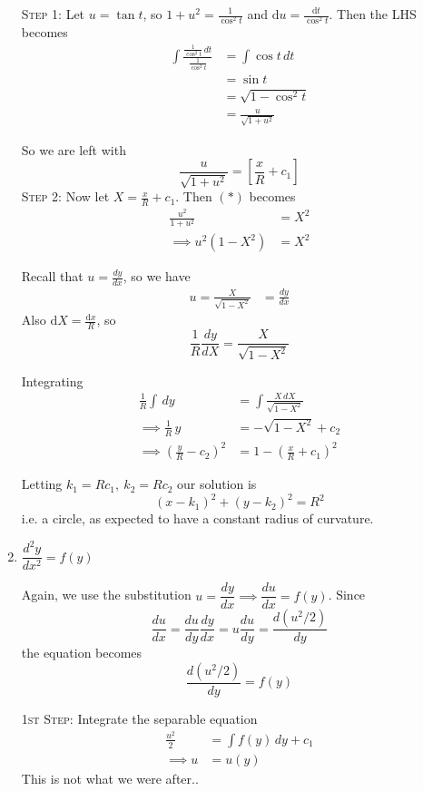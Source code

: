 \documentclass[10pt]{scrartcl}
\begin{document}
\begin{enumerate}[(1)]
\begin{example}[Geometry]
\textsc{Step 1:} Let $u = \tan t$, so $1 + u^2 = \frac{1}{\cos^2t}$ and $\mathrm{d}u = \frac{\mathrm{d}t}{\cos^2t}$. Then the LHS becomes
\[
\begin{aligned}
  \int \frac{\frac{1}{\cos^2t}\,dt}{\frac{1}{\cos^2t}} &= \int \cos t\,dt\\
  &= \sin t\\
  &= \sqrt{1-\cos^2t}\\
  &= \frac{u}{\sqrt{1+u^2}}
\end{aligned}
\]

So we are left with
\[\frac{u}{\sqrt{1+u^2}} = \left[\frac{x}{R}+c_1\right] \tag{$*$}\]
\textsc{Step 2:} Now let $X = \frac{x}{R} + c_1$. Then $(*)$ becomes
\setlength{\jot}{8pt}
\[
\begin{aligned}
  \frac{u^2}{1+u^2} &= X^2\\
\implies   u^2(1-X^2) &= X^2\end{aligned}
\]

Recall that $u = \frac{dy}{dx}$, so we have
\setlength{\jot}{8pt}
\[
\begin{aligned}
  u = \frac{X}{\sqrt{1-X^2}} &= \frac{dy}{dx}
\end{aligned}
  \]
Also  $\mathrm{d}X = \frac{\mathrm{d}x}{R}$, so 
\[
    \frac{1}{R}\frac{dy}{dX} = \frac{X}{\sqrt{1-X^2}}
\]

Integrating
  \[\begin{aligned}  
  \frac{1}{R}\int\,dy &= \int \frac{X\,dX}{\sqrt{1-X^2}}\\
  \implies   \frac{1}{R}\, y &= -\sqrt{1-X^2} + c_2\\
\implies   \left(\frac{y}{R}-c_2\right)^2 &= 1-\left(\frac{x}{R} + c_1\right)^2
\end{aligned}
\]

Letting $k_1 = Rc_1,~ k_2 = Rc_2$ our solution is
\[(x-k_1)^2 + (y-k_2)^2 = R^2\]
i.e. a circle, as expected to have a constant radius of curvature.	
\end{example}\vsp

\item $\dfrac{d^2y}{dx^2} = f(y)$

Again, we use the substitution $u = \dfrac{dy}{dx}\implies \dfrac{du}{dx} = f(y)$. Since \[\dfrac{du}{dx} = \dfrac{du}{dy}\dfrac{dy}{dx}
  = u\dfrac{du}{dy}
  =\dfrac{d(u^2/2)}{dy}\]the equation becomes \[\dfrac{d(u^2/2)}{dy} = f(y)\]

\textsc{1st Step:} Integrate the separable equation\[
\begin{aligned}
  \frac{u^2}{2} &= \int f(y)\,dy + c_1\\
  \implies u &= u(y)
\end{aligned}
\]
This is not what we were after..\\


\end{enumerate}
\end{document}
